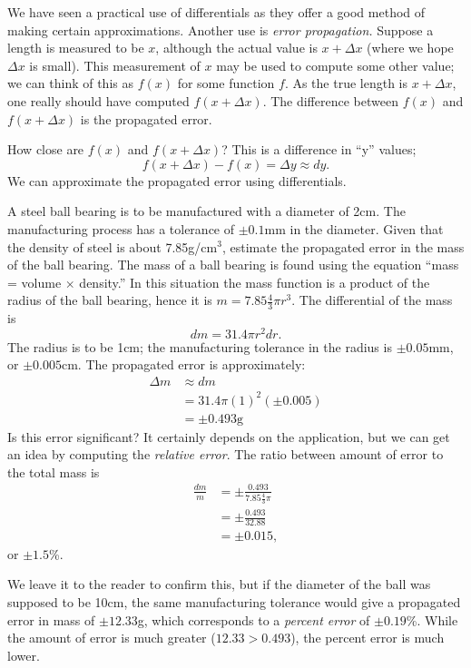 We have seen a practical use of differentials as they offer a good method of making certain approximations. Another use is \emph{error propagation.} Suppose a length is measured to be $x$, although the actual value is $x+\Delta x$ (where we hope $\Delta x$ is small). This measurement of $x$ may be used to compute some other value; we can think of this as $f(x)$ for some function $f$. As the true length is $x+\Delta x$, one really should have computed $f(x+\Delta x)$. The difference between $f(x)$ and $f(x+\Delta x)$ is the propagated error. 

How close are $f(x)$ and $f(x+\Delta x)$? This is a difference in ``y'' values;
\[f(x+\Delta x)-f(x) = \Delta y \approx dy.\]
We can approximate the propagated error using differentials.

\begin{example}\label{ex_diffal4}
A steel ball bearing is to be manufactured with a diameter of 2cm. The manufacturing process has a tolerance of $\pm 0.1$mm in the diameter. Given that the density of steel is about 7.85g/cm$^3$, estimate the propagated error in the mass of the ball bearing.
\solution
The mass of a ball bearing is found using the equation ``mass = volume $\times$ density.'' In this situation the mass function is a product of the radius of the ball bearing, hence it is $m = 7.85\frac43\pi r^3$. The differential of the mass is
\[dm = 31.4\pi r^2 dr.\]
The radius is to be 1cm; the manufacturing tolerance in the radius is $\pm 0.05$mm, or $\pm 0.005$cm. The propagated error is approximately:
\begin{align*}
\Delta m & \approx dm \\
				&= 31.4\pi (1)^2 (\pm 0.005) \\
				&= \pm 0.493\text{g}
\end{align*}
Is this error significant? It certainly depends on the application, but we can get an idea by computing the \emph{relative error}. The ratio between amount of error to the total mass is
\begin{align*}
\frac{dm}{m} &= \pm \frac{0.493}{7.85\frac43\pi} \\
							&=\pm \frac{0.493}{32.88}\\
							&=\pm 0.015,
\end{align*}
or $\pm 1.5$\%. 

We leave it to the reader to confirm this, but if the diameter of the ball was supposed to be 10cm, the same manufacturing tolerance would give a propagated error in mass of $\pm12.33$g, which corresponds to a \emph{percent error} of $\pm0.19$\%. While the amount of error is much greater ($12.33 > 0.493$), the percent error is much lower.
\end{example}


